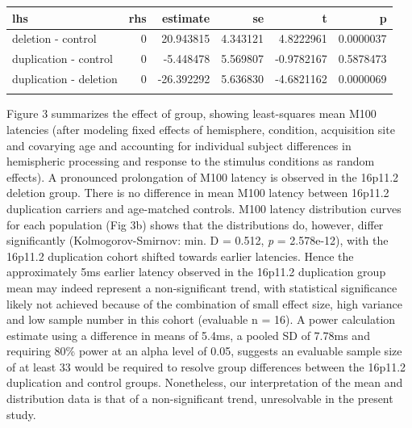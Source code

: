 \documentclass[]{article}
\begin{document}
\begin{longtable}[c]{@{}lrrrrr@{}}
\toprule
lhs & rhs & estimate & se & t & p\tabularnewline
\midrule
\endhead
deletion - control & 0 & 20.943815 & 4.343121 & 4.8222961 &
0.0000037\tabularnewline
duplication - control & 0 & -5.448478 & 5.569807 & -0.9782167 &
0.5878473\tabularnewline
duplication - deletion & 0 & -26.392292 & 5.636830 & -4.6821162 &
0.0000069\tabularnewline
\medskip & & & & &\tabularnewline
\bottomrule
\end{longtable}

Figure 3 summarizes the effect of group, showing least-squares mean M100
latencies (after modeling fixed effects of hemisphere, condition,
acquisition site and covarying age and accounting for individual subject
differences in hemispheric processing and response to the stimulus
conditions as random effects). A pronounced prolongation of M100 latency
is observed in the 16p11.2 deletion group. There is no difference in
mean M100 latency between 16p11.2 duplication carriers and age-matched
controls. M100 latency distribution curves for each population (Fig 3b)
shows that the distributions do, however, differ significantly
(Kolmogorov-Smirnov: min. D = 0.512, \emph{p} = 2.578e-12), with the
16p11.2 duplication cohort shifted towards earlier latencies. Hence the
approximately 5ms earlier latency observed in the 16p11.2 duplication
group mean may indeed represent a non-significant trend, with
statistical significance likely not achieved because of the combination
of small effect size, high variance and low sample number in this cohort
(evaluable n = 16). A power calculation estimate using a difference in
means of 5.4ms, a pooled SD of 7.78ms and requiring 80\% power at an
alpha level of 0.05, suggests an evaluable sample size of at least 33
would be required to resolve group differences between the 16p11.2
duplication and control groups. Nonetheless, our interpretation of the
mean and distribution data is that of a non-significant trend,
unresolvable in the present study.
\end{document}
